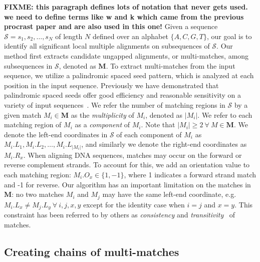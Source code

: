 \documentclass{ws-procs975x65}
\begin{document}
\textbf{FIXME:  this paragraph defines lots of notation that never gets used.  we need to define terms like w and k which came from the previous procrast paper and are also used in this one!}
Given a sequence $\mathcal{S}=s_1, s_2,\dots, s_N$ of length $N$
defined over an alphabet $\{A,C,G,T\}$, our goal is to identify all
significant local multiple alignments on subsequences of $\mathcal{S}$. Our
method first extracts candidate ungapped alignments, or multi-matches,
among subsequences in $\mathcal{S}$, denoted as $\mathbf{M}$. To extract multi-matches from the input sequence, we utilize a palindromic spaced seed pattern, which is analyzed at each position in the input sequence.  Previously we have demonstrated that palindromic spaced seeds offer good efficiency and reasonable sensitivity on a variety of input sequences~\cite{ref-procrast}.
We refer the number of matching regions in $\mathcal{S}$
by a given match $M_i \in \mathbf{M}$ as the
\textit{multiplicity} of $M_i$, denoted as $|M_i|$. We refer to each
matching region of $M_i$ as a \textit{component} of $M_i$. Note that
$|M_i| \geq 2~\forall~M \in \mathbf{M}$.  We denote the left-end
coordinates in $\mathcal{S}$ of each component of $M_i$ as $M_i.L_1,
M_i.L_2,\dots, M_i.L_{|M_i|}$, and similarly we denote the right-end
coordinates as $M_i.R_x$.  When aligning DNA sequences, matches may
occur on the forward or reverse complement strands. To account for
this, we add an orientation value to each matching region:
$M_i.O_x \in \{1,-1\}$, where 1 indicates a forward strand match and
-1 for reverse. Our algorithm has an important limitation on the matches in
$\mathbf{M}$: no two matches $M_i$ and $M_j$ may have the same
left-end coordinate, e.g. $M_i.L_x \neq M_j.L_y~\forall~i, j, x, y$
except for the identity case when $i=j$ and $x=y$.  This constraint
has been referred to by others as \textit{consistency} and
\textit{transitivity}~\cite{ref-transitivity} of matches.

\subsection{Creating chains of multi-matches}
\end{document}
